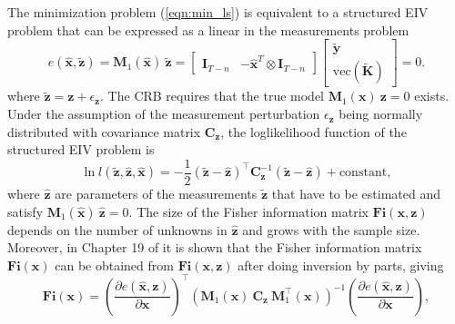 The minimization problem (\ref{eqn:min_ls}) is equivalent to a structured EIV problem that can be expressed as a linear in the measurements problem \cite{Pintelon12Book}
\begin{equation} e (\widehat{\mathbf{x}}, \widetilde{\mathbf{z}}) = \mathbf{M}_1( \widehat{\mathbf{x}} ) \ \widetilde{\mathbf{z}} = \begin{bmatrix} \mathbf{I}_{T-n} & - \widehat{\mathbf{x}}^T \otimes \mathbf{I}_{T-n} \end{bmatrix} \begin{bmatrix} \widetilde{\mathbf{y}} \\ \mathrm{vec} ( \widetilde{\mathbf{K}} ) \end{bmatrix} = 0 . \label{eqn:M1vecyK} \end{equation}
where $\widetilde{\mathbf{z}} = \mathbf{z} + \epsilon_{\mathbf{z}}$.
The CRB requires that the true model $\mathbf{M}_1( \mathbf{x} ) \ \mathbf{z} = 0$ exists.
Under the assumption of the measurement perturbation $\epsilon_{\mathbf{z}}$ being normally distributed with covariance matrix $\mathbf{C}_{\mathbf{z}}$, the loglikelihood function of the structured EIV problem is
\begin{equation} \ln{ l(\widetilde{\mathbf{z}}, \widehat{\mathbf{z}}, \widehat{\mathbf{x}}) } = - \frac{1}{2} \left( \widetilde{\mathbf{z}} - \widehat{\mathbf{z}} \right)^\top \mathbf{C}_{\mathbf{z}}^{-1} \left( \widetilde{\mathbf{z}} - \widehat{\mathbf{z}} \right) + \mathrm{constant}, \end{equation}
where $\widehat{\mathbf{z}}$ are parameters of the measurements $\widetilde{\mathbf{z}}$ that have to be estimated and satisfy $\mathbf{M}_1( \widehat{\mathbf{x}} ) \ \widehat{\mathbf{z}} = 0$.
The size of the Fisher information matrix $\mathbf{Fi}(\mathbf{x}, \mathbf{z})$ depends on the number of unknowns in $\widehat{\mathbf{z}}$ and grows with the sample size.
Moreover, in Chapter 19 of \cite{Pintelon12Book} it is shown that the Fisher information matrix $\mathbf{Fi}(\mathbf{x})$ can be obtained from $\mathbf{Fi}(\mathbf{x}, \mathbf{z})$ after doing inversion by parts, giving
\begin{equation} \mathbf{Fi}(\mathbf{x}) = \left( \frac{\partial e (\widehat{\mathbf{x}}, \mathbf{z}) }{\partial \mathbf{x} } \right)^\top \left( \mathbf{M}_1( \mathbf{x} ) \ \mathbf{C}_{\mathbf{z}} \ \mathbf{M}_1^\top( \mathbf{x} ) \right)^{-1} \left( \frac{\partial e (\widehat{\mathbf{x}}, \mathbf{z}) }{\partial \mathbf{x} } \right) 
 , \label{eqn:FIM} \end{equation} 
